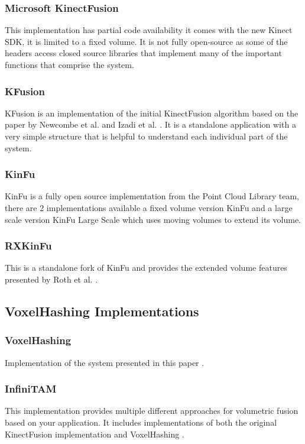 \documentclass[10pt, twocolumn]{article}
\begin{document}
\subsubsection{Microsoft KinectFusion}
This implementation has partial code availability it comes with the new Kinect SDK, it is limited to a fixed volume. It is not fully open-source as some of the headers access closed source libraries that implement many of the important functions that comprise the system. 

\subsubsection{KFusion}
KFusion is an implementation of the initial KinectFusion algorithm based on the
paper by Newcombe et al. \cite{newcombe11} and Izadi et al. \cite{izadi11}. It is a standalone application with a very simple structure that is helpful to understand each individual part of the system.

\subsubsection{KinFu}
KinFu is a fully open source implementation from the Point Cloud Library team,
there are 2 implementations available a fixed volume version KinFu and a large
scale version KinFu Large Scale which uses moving volumes to extend its volume.

\subsubsection{RXKinFu}
This is a standalone fork of KinFu and provides the extended volume features
presented by Roth et al. \cite{roth2012moving}. 

\subsection{VoxelHashing Implementations}
\subsubsection{VoxelHashing}
Implementation of the system presented in this paper \cite{niessner2013hashing}.

\subsubsection{InfiniTAM}
This implementation provides multiple different approaches for volumetric fusion
based on your application. It includes implementations of both the original
KinectFusion implementation \cite{newcombe11} \cite{izadi11} and VoxelHashing \cite{niessner2013hashing}.
\end{document}
